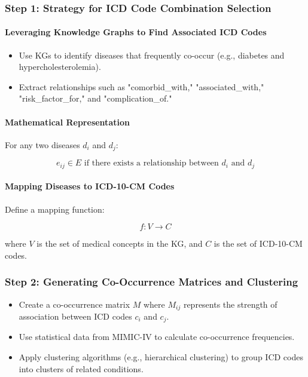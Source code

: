 \documentclass[12pt, a4paper]{article}
\begin{document}
\subsubsection{Step 1: Strategy for ICD Code Combination Selection}

\paragraph{Leveraging Knowledge Graphs to Find Associated ICD Codes}

\begin{itemize}
    \item Use KGs to identify diseases that frequently co-occur (e.g., diabetes and hypercholesterolemia).
    \item Extract relationships such as "comorbid\_with," "associated\_with," "risk\_factor\_for," and "complication\_of."
\end{itemize}

\paragraph{Mathematical Representation}

For any two diseases \( d_i \) and \( d_j \):

\begin{equation}
e_{ij} \in E \text{ if there exists a relationship between } d_i \text{ and } d_j
\end{equation}

\paragraph{Mapping Diseases to ICD-10-CM Codes}

Define a mapping function:

\begin{equation}
f: V \rightarrow C
\end{equation}

where \( V \) is the set of medical concepts in the KG, and \( C \) is the set of ICD-10-CM codes.

\subsubsection{Step 2: Generating Co-Occurrence Matrices and Clustering}

\begin{itemize}
    \item Create a co-occurrence matrix \( M \) where \( M_{ij} \) represents the strength of association between ICD codes \( c_i \) and \( c_j \).
    \item Use statistical data from MIMIC-IV to calculate co-occurrence frequencies.
    \item Apply clustering algorithms (e.g., hierarchical clustering) to group ICD codes into clusters of related conditions.
\end{itemize}
\end{document}
